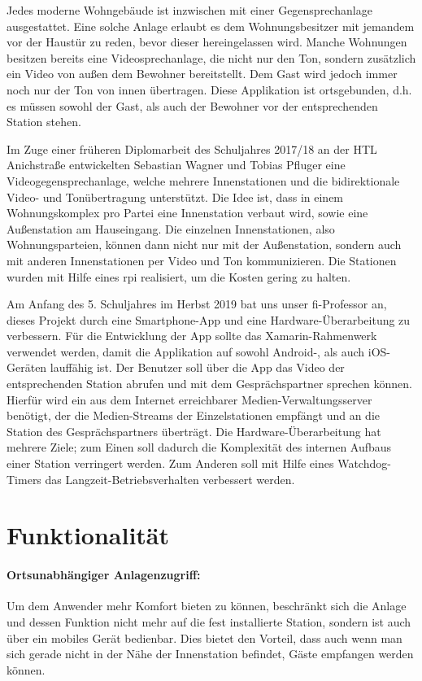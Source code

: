 Jedes moderne Wohngebäude ist inzwischen mit einer Gegensprechanlage ausgestattet.
Eine solche Anlage erlaubt es dem Wohnungsbesitzer mit jemandem vor der Haustür zu reden, bevor dieser hereingelassen wird.
Manche Wohnungen besitzen bereits eine Videosprechanlage, die nicht nur den Ton, sondern zusätzlich ein Video von außen dem Bewohner bereitstellt.
Dem Gast wird jedoch immer noch nur der Ton von innen übertragen.
Diese Applikation ist ortsgebunden, d.h. es müssen sowohl der Gast, als auch der Bewohner vor der entsprechenden Station stehen.\par

Im Zuge einer früheren Diplomarbeit des Schuljahres 2017/18 an der HTL Anichstraße entwickelten Sebastian Wagner und Tobias Pfluger eine Videogegensprechanlage, welche mehrere Innenstationen und die bidirektionale Video- und Tonübertragung unterstützt.
Die Idee ist, dass in einem Wohnungskomplex pro Partei eine Innenstation verbaut wird, sowie eine Außenstation am Hauseingang.
Die einzelnen Innenstationen, also Wohnungsparteien, können dann nicht nur mit der Außenstation, sondern auch mit anderen Innenstationen per Video und Ton kommunizieren.
Die Stationen wurden mit Hilfe eines \ac{rpi} realisiert, um die Kosten gering zu halten.\par

Am Anfang des 5. Schuljahres im Herbst 2019 bat uns unser \ac{fi}-Professor \MarioPrantl an, dieses Projekt durch eine Smartphone-App und eine Hardware-Überarbeitung zu verbessern.
Für die Entwicklung der App sollte das Xamarin-Rahmenwerk verwendet werden, damit die Applikation auf sowohl Android-, als auch iOS-Geräten lauffähig ist. 
Der Benutzer soll über die App das Video der entsprechenden Station abrufen und mit dem Gesprächspartner sprechen können.
Hierfür wird ein aus dem Internet erreichbarer Medien-Verwaltungsserver benötigt, der die Medien-Streams der Einzelstationen empfängt und an die Station des Gesprächspartners überträgt.
Die Hardware-Überarbeitung hat mehrere Ziele; zum Einen soll dadurch die Komplexität des internen Aufbaus einer Station verringert werden.
Zum Anderen soll mit Hilfe eines Watchdog-Timers das Langzeit-Betriebsverhalten verbessert werden.

\section{Funktionalität}
\paragraph{Ortsunabhängiger Anlagenzugriff:}
Um dem Anwender mehr Komfort bieten zu können, beschränkt sich die Anlage und dessen Funktion nicht mehr auf die fest installierte Station, sondern ist auch über ein mobiles Gerät bedienbar.
Dies bietet den Vorteil, dass auch wenn man sich gerade nicht in der Nähe der Innenstation befindet, Gäste empfangen werden können.

